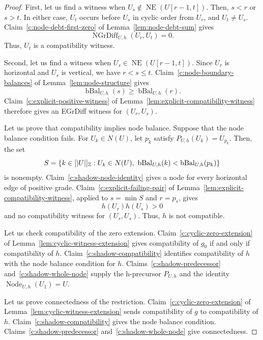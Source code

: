 \begin{proof}
First, let us find a witness when $U_s\notin\operatorname{NE}(U[r-1,t])$.
Then, $s<r$ or $s>t$.
In either case, $U_t$ occurs before $U_s$ in cyclic order from $U_r$, and $U_t\ne U_s$.
Claim~\ref{c:node-debt-first-zero} of Lemma~\ref{lem:node-debt-sum} gives
\[
 \operatorname{NGrDiff}_{U,h}(U_r,U_t)=0.
\]
Thus, $U_t$ is a compatibility witness.

Second, let us find a witness when $U_s\in\operatorname{NE}(U[r-1,t])$.
Since $U_r$ is horizontal and $U_s$ is vertical, we have $r<s\le t$.
Claim~\ref{c:node-boundary-balances} of Lemma~\ref{lem:node-structure} gives
\[
 \operatorname{bBal}_{U,h}(s)\ge\operatorname{bBal}_{U,h}(r).
\]
Claim~\ref{c:explicit-positive-witness} of Lemma~\ref{lem:explicit-compatibility-witness}
therefore gives an EGrDiff witness for $(U_r,U_s)$.

Let us prove that compatibility implies node balance.
Suppose that the node balance condition fails.
For $U_k\in N(U)$, let $p_k$ satisfy $P_{U,h}(U_k)=U_{p_k}$.
Then, the set
\[
 S=\{k\in[|U|]_{\mathbb Z}:U_k\in N(U),\
       \operatorname{bBal}_{U,h}(k)<\operatorname{bBal}_{U,h}(p_k)\}
\]
is nonempty.
Claim~\ref{c:shadow-node-identity} gives a node for every horizontal edge of positive grade.
Claim~\ref{c:explicit-failing-pair} of Lemma~\ref{lem:explicit-compatibility-witness}, applied to $s=\min S$ and $r=p_s$, gives
\[
 h(U_r)h(U_s)>0
\]
and no compatibility witness for $(U_r,U_s)$.
Thus, $h$ is not compatible.

 Let us check compatibility of the zero extension.
Claim~\ref{c:cyclic-zero-extension} of
Lemma~\ref{lem:cyclic-witness-extension} gives compatibility of $g_0$
if and only if compatibility of $h$.
Claim~\ref{c:shadow-compatibility} identifies compatibility of $h$ with the node balance condition for $h$.
Claims~\ref{c:shadow-predecessor} and~\ref{c:shadow-whole-node} supply
the h-precursor $P_{U,h}$ and the identity $\operatorname{Node}_{U,h}(U_1)=U$.

 Let us prove connectedness of the restriction.
Claim~\ref{c:cyclic-zero-extension} of
Lemma~\ref{lem:cyclic-witness-extension} sends compatibility of $g$ to compatibility of $h$.
Claim~\ref{c:shadow-compatibility} gives the node balance condition.
Claims~\ref{c:shadow-predecessor} and~\ref{c:shadow-whole-node} give connectedness.
\end{proof}

